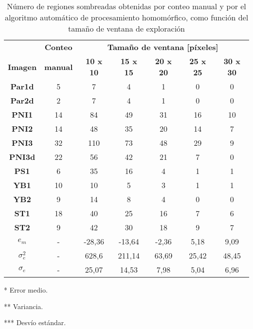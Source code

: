 \begin{table}[]
    \centering
    \begin{threeparttable}[b]
        
        \caption{Número de regiones sombreadas obtenidas por conteo manual y por el algoritmo automático de procesamiento homomórfico, como función del tamaño de ventana de exploración}
        \label{tab:resultados_homomorfico}
        \begin{tabular}{ccccccc}
        \hline
        \hline
                  & \textbf{Conteo}  & \multicolumn{5}{c}{\textbf{Tamaño de ventana [píxeles]}}   \\
            \textbf{Imagen}& \textbf{manual}  & \textbf{10 x 10}     & \textbf{15 x 15}     & \textbf{20 x 20 }   & \textbf{25 x 25}    & \textbf{30 x 30 }   \\ \hline
            \textbf{Par1d}  & 5  & 7      & 4      & 1     & 0     & 0     \\
            \textbf{Par2d}  & 2  & 7      & 4      & 1     & 0     & 0     \\
            \textbf{PNI1}   & 14 & 84     & 49     & 31    & 16    & 10    \\
            \textbf{PNI2}   & 14 & 48     & 35     & 20    & 14    & 7     \\
            \textbf{PNI3}   & 32 & 110    & 73     & 48    & 29    & 9     \\
            \textbf{PNI3d}  & 22 & 56     & 42     & 21    & 7     & 0     \\
            \textbf{PS1}    & 6  & 35     & 16     & 4     & 1     & 1     \\
            \textbf{YB1}    & 10 & 10     & 5      & 3     & 1     & 1     \\
            \textbf{YB2}    & 9  & 14     & 8      & 4     & 0     & 0     \\
            \textbf{ST1}    & 18 & 40     & 25     & 16    & 7     & 6     \\
            \textbf{ST2}    & 9  & 42     & 30     & 18    & 9     & 7     \\ \hline
            $e_{m}$\tnote{*}    & -  & -28,36 & -13,64 & -2,36 & 5,18  & 9,09  \\
            $\sigma^2_{e}$ \tnote{**}   & -  & 628,6  & 211,14 & 63,69 & 25,42 & 48,45 \\
           $\sigma_{e}$ \tnote{***}   & -  & 25,07  & 14,53  & 7,98  & 5,04  & 6,96  \\ \hline \hline
        \end{tabular}
        \begin{tablenotes}
        \tiny{
                \item [*]Error medio.
                \item [**]Variancia.
                \item [***] Desvío estándar.
                }
        \end{tablenotes}
  \end{threeparttable}
\end{table}
       